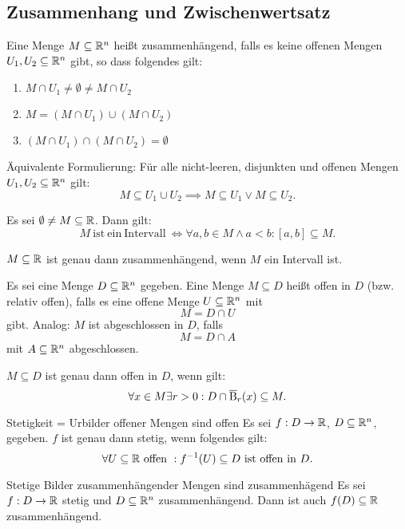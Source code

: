 \subsection{Zusammenhang und Zwischenwertsatz}
\begin{defn}
    Eine Menge $M\subseteq \mathbb{R}^n$ heißt zusammenhängend, falls es keine offenen Mengen $U_1, U_2\subseteq \mathbb{R}^n$ gibt, so dass folgendes gilt:
    \begin{enumerate}
        \item $M\cap U_1 \neq \emptyset\neq M\cap U_2$
        \item $M = (M\cap U_1)\cup (M\cap U_2)$
        \item $(M\cap U_1)\cap (M\cap U_2) = \emptyset$
    \end{enumerate}
    Äquivalente Formulierung: Für alle nicht-leeren, disjunkten und offenen Mengen $U_1, U_2\subseteq \mathbb{R}^n$ gilt:
    \[
        M\subseteq U_1\cup U_2 \implies M\subseteq U_1 \lor M\subseteq U_2.
    \]
\end{defn}
\begin{satz}
    Es sei $\emptyset\neq M\subseteq \mathbb{R}$. Dann gilt:
    \[
        M\mathrm{\ ist\ ein\ Intervall\ } \iff \forall a,b\in M\land a<b: [a,b]\subseteq M.
    \]
\end{satz}
\begin{satz}
    $M\subseteq \mathbb{R}$ ist genau dann zusammenhängend, wenn $M$ ein Intervall ist.
\end{satz}
\begin{defn}
    Es sei eine Menge $D\subseteq \mathbb{R}^n$ gegeben.
    Eine Menge $M\subseteq D$ heißt offen in $D$ (bzw. relativ offen),
    falls es eine offene Menge $U\subseteq \mathbb{R}^n$ mit
    \[
        M = D\cap U
    \] gibt.
    Analog: $M$ ist abgeschlossen in $D$, falls
    \[
        M = D\cap A
    \] mit $A\subseteq \mathbb{R}^n$ abgeschlossen.
\end{defn}
\begin{lemma}
    $M\subseteq D$ ist genau dann offen in $D$, wenn gilt:
    \[
        \forall x\in M \exists r>0: D\cap\operatorname{\overline{B}}_r(x)\subseteq M.
    \]
\end{lemma}
\begin{lemma}{Stetigkeit = Urbilder offener Mengen sind offen}
    Es sei $f:D\to \mathbb{R}$, $D\subseteq \mathbb{R}^n$, gegeben. $f$ ist genau dann stetig, wenn folgendes gilt:
    \[
        \forall U\subseteq \mathbb{R} \mathrm{\ offen\ }: f^{-1}(U)\subseteq D \mathrm{\ ist\ offen\ in\ } D.
    \]
\end{lemma}
\begin{satz}{Stetige Bilder zusammenhängender Mengen sind zusammenhägend}
    Es sei $f:D\to \mathbb{R}$ stetig und $D\subseteq\mathbb{R}^n$ zusammenhängend.
    Dann ist auch $f(D)\subseteq \mathbb{R}$ zusammenhängend.
\end{satz}
